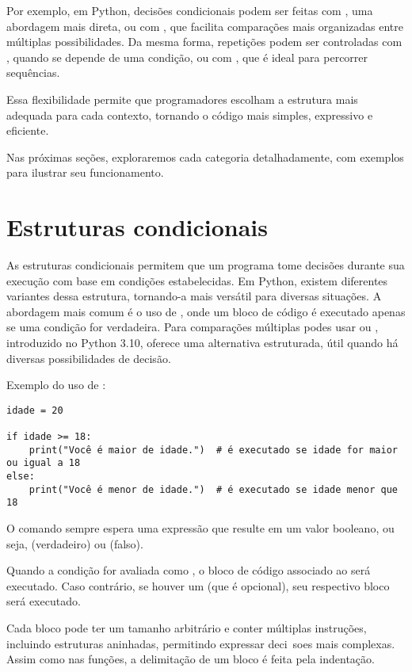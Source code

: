Por exemplo, em Python, decisões condicionais podem ser feitas com , uma abordagem mais direta, ou
com , que facilita comparações mais organizadas entre múltiplas possibilidades.
Da mesma forma, repetições podem ser controladas com , quando se depende de uma condição, ou
com , que é ideal para percorrer sequências.

Essa flexibilidade permite que programadores escolham a estrutura mais adequada para cada contexto, tornando o
código mais simples, expressivo e eficiente.

Nas próximas seções, exploraremos cada categoria detalhadamente, com exemplos para ilustrar seu funcionamento.


\section{Estruturas condicionais}\label{if}
As estruturas condicionais permitem que um programa tome decisões durante sua execução com base em condições
estabelecidas.
Em Python, existem diferentes variantes dessa estrutura, tornando-a mais versátil para diversas situações.
A abordagem mais comum é o uso de , onde um bloco de código é executado apenas se uma condição for
verdadeira.
Para comparações múltiplas podes usar  ou ,
introduzido no Python 3.10, oferece uma alternativa estruturada, útil quando há diversas possibilidades de decisão.

Exemplo do uso de :
\begin{verbatim}
idade = 20

if idade >= 18:
    print("Você é maior de idade.")  # é executado se idade for maior ou igual a 18
else:
    print("Você é menor de idade.")  # é executado se idade menor que 18
\end{verbatim}

O comando  sempre espera uma expressão que resulte em um valor booleano,
ou seja,  (verdadeiro) ou  (falso).

Quando a condição for avaliada como , o bloco de código associado ao  será executado.
Caso contrário, se houver um  (que é opcional), seu respectivo bloco será executado.

Cada bloco pode ter um tamanho arbitrário e conter múltiplas instruções, incluindo estruturas 
aninhadas, permitindo expressar deci~soes mais complexas.
Assim como nas funções, a delimitação de um bloco  é feita pela indentação.

